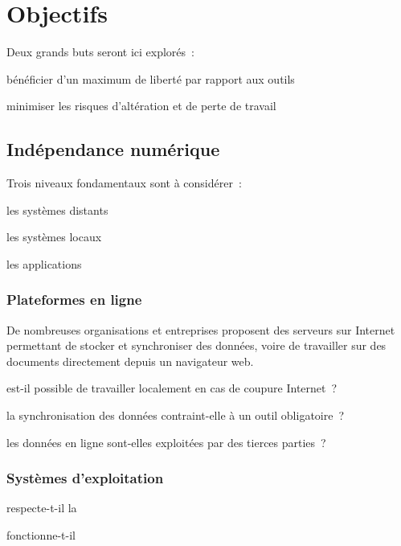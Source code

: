\section{Objectifs}

Deux grands buts seront ici explorés :
\begin{itmz}
\item{bénéficier d’un maximum de liberté par rapport aux outils}
\item{minimiser les risques d’altération et de perte de travail}
\end{itmz}
\subsection{Indépendance numérique}

Trois niveaux fondamentaux sont à considérer :
\begin{itmz}
\item{les systèmes distants}
\item{les systèmes locaux}
\item{les applications}
\end{itmz}

\subsubsection{Plateformes en ligne}

De nombreuses organisations et entreprises proposent des serveurs sur Internet
permettant de stocker et synchroniser des données, voire de travailler sur des
documents directement depuis un navigateur web.

\begin{itmz}
\item{est-il possible de travailler localement en cas de coupure Internet ?}
\item{la synchronisation des données contraint-elle à un outil obligatoire ?}
\item{les données en ligne sont-elles exploitées par des tierces parties ?}
\end{itmz}

\subsubsection{Systèmes d’exploitation}

\begin{itmz}
\item{respecte-t-il la }
\item{fonctionne-t-il }
\end{itmz}

